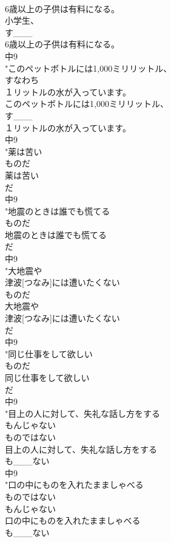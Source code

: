 \documentclass[8pt]{extreport}
\begin{document}
\begin{CJK}{UTF8}{min}
\\	6歳以上の子供は有料になる。
\\	小学生、
\\	す___
\\	6歳以上の子供は有料になる。
\\	中9
\\	"このペットボトルには1,000ミリリットル、
\\	すなわち
\\	１リットルの水が入っています。
\\	このペットボトルには1,000ミリリットル、
\\	す___
\\	１リットルの水が入っています。
\\	中9
\\	"薬は苦い
\\	ものだ
\\	薬は苦い
\\	だ
\\	中9
\\	"地震のときは誰でも慌てる
\\	ものだ
\\	地震のときは誰でも慌てる
\\	だ
\\	中9
\\	"大地震や
\\	津波[つなみ]には遭いたくない
\\	ものだ
\\	大地震や
\\	津波[つなみ]には遭いたくない
\\	だ
\\	中9
\\	"同じ仕事をして欲しい
\\	ものだ
\\	同じ仕事をして欲しい
\\	だ
\\	中9
\\	"目上の人に対して、失礼な話し方をする
\\	もんじゃない
\\	ものではない
\\	目上の人に対して、失礼な話し方をする
\\	も___ない
\\	中9
\\	"口の中にものを入れたまましゃべる
\\	ものではない
\\	もんじゃない
\\	口の中にものを入れたまましゃべる
\\	も___ない

\end{CJK}
\end{document}
